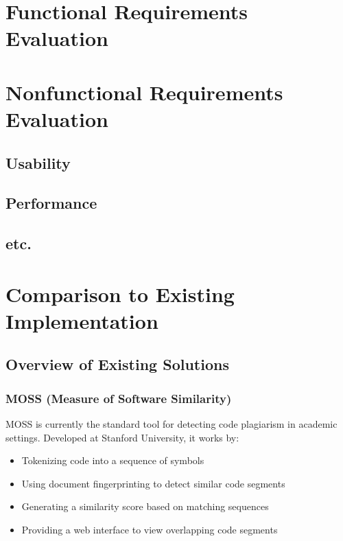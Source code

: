 \documentclass[12pt, titlepage]{article}
\begin{document}
\newpage


\section{Functional Requirements Evaluation}

\section{Nonfunctional Requirements Evaluation}

\subsection{Usability}
		
\subsection{Performance}

\subsection{etc.}
	
\section{Comparison to Existing Implementation}	

\subsection{Overview of Existing Solutions}

\subsubsection{MOSS (Measure of Software Similarity)}
MOSS is currently the standard tool for detecting code plagiarism in academic settings. Developed at Stanford University, it works by:
\begin{itemize}
    \item Tokenizing code into a sequence of symbols
    \item Using document fingerprinting to detect similar code segments
    \item Generating a similarity score based on matching sequences
    \item Providing a web interface to view overlapping code segments
\end{itemize}
\end{document}
